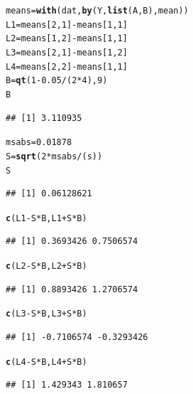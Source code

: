 \documentclass{article}\usepackage[]{graphicx}\usepackage[]{color}
\makeatletter
\newcommand{\hlnum}[1]{\textcolor[rgb]{0.686,0.059,0.569}{#1}}%
\newcommand{\hlopt}[1]{\textcolor[rgb]{0,0,0}{#1}}%
\newcommand{\hlstd}[1]{\textcolor[rgb]{0.345,0.345,0.345}{#1}}%
\newcommand{\hlkwb}[1]{\textcolor[rgb]{0.69,0.353,0.396}{#1}}%
\newcommand{\hlkwd}[1]{\textcolor[rgb]{0.737,0.353,0.396}{\textbf{#1}}}%
\newenvironment{kframe}{%
 \def\at@end@of@kframe{}%
 \ifinner\ifhmode%
  \def\at@end@of@kframe{\end{minipage}}%
  \begin{minipage}{\columnwidth}%
 \fi\fi%
 \def\FrameCommand##1{\hskip\@totalleftmargin \hskip-\fboxsep
 \colorbox{shadecolor}{##1}\hskip-\fboxsep
     \hskip-\linewidth \hskip-\@totalleftmargin \hskip\columnwidth}%
 \MakeFramed {\advance\hsize-\width
   \@totalleftmargin\z@ \linewidth\hsize
   \@setminipage}}%
 {\par\unskip\endMakeFramed%
 \at@end@of@kframe}
\newenvironment{knitrout}{}{} %
\makeatother
\begin{document}
\begin{enumerate}[(a)]
\begin{knitrout}
\color{fgcolor}\begin{kframe}
\begin{alltt}
  \hlstd{means} \hlkwb{=} \hlkwd{with}\hlstd{(dat,} \hlkwd{by}\hlstd{(Y,} \hlkwd{list}\hlstd{(A,B) , mean))}
  \hlstd{L1} \hlkwb{=} \hlstd{means[}\hlnum{2}\hlstd{,}\hlnum{1}\hlstd{]} \hlopt{-} \hlstd{means[}\hlnum{1}\hlstd{,}\hlnum{1}\hlstd{]}
  \hlstd{L2} \hlkwb{=} \hlstd{means[}\hlnum{1}\hlstd{,}\hlnum{2}\hlstd{]} \hlopt{-} \hlstd{means[}\hlnum{1}\hlstd{,}\hlnum{1}\hlstd{]}
  \hlstd{L3} \hlkwb{=} \hlstd{means[}\hlnum{2}\hlstd{,}\hlnum{1}\hlstd{]} \hlopt{-} \hlstd{means[}\hlnum{1}\hlstd{,}\hlnum{2}\hlstd{]}
  \hlstd{L4} \hlkwb{=} \hlstd{means[}\hlnum{2}\hlstd{,}\hlnum{2}\hlstd{]} \hlopt{-} \hlstd{means[}\hlnum{1}\hlstd{,}\hlnum{1}\hlstd{]}
  \hlstd{B} \hlkwb{=} \hlkwd{qt}\hlstd{(}\hlnum{1}\hlopt{-}\hlnum{0.05}\hlopt{/}\hlstd{(}\hlnum{2}\hlopt{*}\hlnum{4}\hlstd{),} \hlnum{9}\hlstd{)}
  \hlstd{B}
\end{alltt}
\begin{verbatim}
## [1] 3.110935
\end{verbatim}
\begin{alltt}
  \hlstd{msabs} \hlkwb{=} \hlnum{0.01878}
  \hlstd{S} \hlkwb{=} \hlkwd{sqrt}\hlstd{(}\hlnum{2}\hlopt{*}\hlstd{msabs}\hlopt{/}\hlstd{(s))}
  \hlstd{S}
\end{alltt}
\begin{verbatim}
## [1] 0.06128621
\end{verbatim}
\begin{alltt}
  \hlkwd{c}\hlstd{(L1}\hlopt{-}\hlstd{S}\hlopt{*}\hlstd{B, L1}\hlopt{+}\hlstd{S}\hlopt{*}\hlstd{B)}
\end{alltt}
\begin{verbatim}
## [1] 0.3693426 0.7506574
\end{verbatim}
\begin{alltt}
  \hlkwd{c}\hlstd{(L2}\hlopt{-}\hlstd{S}\hlopt{*}\hlstd{B, L2}\hlopt{+}\hlstd{S}\hlopt{*}\hlstd{B)}
\end{alltt}
\begin{verbatim}
## [1] 0.8893426 1.2706574
\end{verbatim}
\begin{alltt}
  \hlkwd{c}\hlstd{(L3}\hlopt{-}\hlstd{S}\hlopt{*}\hlstd{B, L3}\hlopt{+}\hlstd{S}\hlopt{*}\hlstd{B)}
\end{alltt}
\begin{verbatim}
## [1] -0.7106574 -0.3293426
\end{verbatim}
\begin{alltt}
  \hlkwd{c}\hlstd{(L4}\hlopt{-}\hlstd{S}\hlopt{*}\hlstd{B, L4}\hlopt{+}\hlstd{S}\hlopt{*}\hlstd{B)}
\end{alltt}
\begin{verbatim}
## [1] 1.429343 1.810657
\end{verbatim}
\end{kframe}
\end{knitrout}


\end{enumerate}
\end{document}
